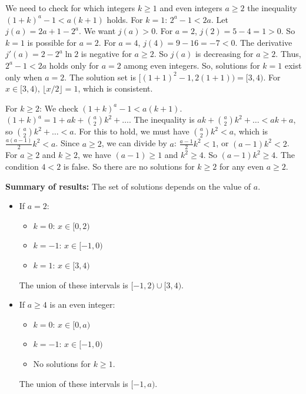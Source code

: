 \documentclass[12pt,a4paper]{article}
\theoremstyle{definition}
\begin{document}
        We need to check for which integers $k \geq 1$ and even integers $a \geq 2$ the inequality $(1+k)^a-1 < a(k+1)$ holds.
        For $k=1$: $2^a-1 < 2a$.
        Let $j(a) = 2a+1-2^a$. We want $j(a)>0$.
        For $a=2$, $j(2)=5-4=1>0$. So $k=1$ is possible for $a=2$.
        For $a=4$, $j(4)=9-16=-7<0$.
        The derivative $j'(a)=2-2^a\ln 2$ is negative for $a \geq 2$. So $j(a)$ is decreasing for $a \geq 2$.
        Thus, $2^a-1 < 2a$ holds only for $a=2$ among even integers.
        So, solutions for $k=1$ exist only when $a=2$. The solution set is $[(1+1)^2-1, 2(1+1)) = [3, 4)$.
        For $x \in [3,4)$, $\lfloor x/2 \rfloor = 1$, which is consistent.

        For $k \geq 2$: We check $(1+k)^a-1 < a(k+1)$.
        $(1+k)^a = 1+ak+\binom{a}{2}k^2 + \ldots$. The inequality is $ak+\binom{a}{2}k^2+\ldots < ak+a$, so $\binom{a}{2}k^2+\ldots < a$.
        For this to hold, we must have $\binom{a}{2}k^2 < a$, which is $\frac{a(a-1)}{2}k^2 < a$. Since $a \geq 2$, we can divide by $a$: $\frac{a-1}{2}k^2 < 1$, or $(a-1)k^2 < 2$.
        For $a \geq 2$ and $k \geq 2$, we have $(a-1) \geq 1$ and $k^2 \geq 4$. So $(a-1)k^2 \geq 4$.
        The condition $4 < 2$ is false. So there are no solutions for $k \geq 2$ for any even $a \geq 2$.

        \textbf{Summary of results:}
        The set of solutions depends on the value of $a$.
        \begin{itemize}
            \item If $a=2$:
            \begin{itemize}
                \item $k=0$: $x \in [0, 2)$
                \item $k=-1$: $x \in [-1, 0)$
                \item $k=1$: $x \in [3, 4)$
            \end{itemize}
            The union of these intervals is $[-1, 2) \cup [3, 4)$.

            \item If $a \geq 4$ is an even integer:
            \begin{itemize}
                \item $k=0$: $x \in [0, a)$
                \item $k=-1$: $x \in [-1, 0)$
                \item No solutions for $k \geq 1$.
            \end{itemize}
            The union of these intervals is $[-1, a)$.
        \end{itemize}
\end{document}
